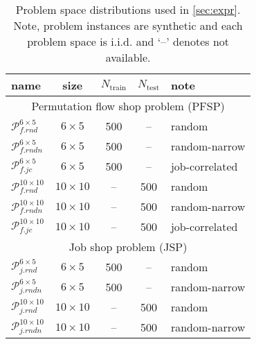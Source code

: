 \documentclass[graybox]{svmult}
\begin{document}
\begin{table}\centering
	\caption{Problem space distributions used in \cref{sec:expr}. Note, problem 
		instances are synthetic and each problem space is i.i.d. and `--' 
		denotes not 
		available.}\label{tbl:data:sim}
	{\renewcommand{\arraystretch}{1.5}
		\begin{tabular}{l|c|c|c|l}\toprule
			name                                & size         & $N_{\text{train}}$ & $N_{\text{test}}$ & note           
			\\  \midrule
			\multicolumn{5}{c}{Permutation flow shop problem (PFSP)} \\ \midrule
			$\mathcal{P}_{f.rnd}^{6\times5}$    & $6\times5$   & 500                & --                & random         \\ 
			$\mathcal{P}_{f.rndn}^{6\times5}$   & $6\times5$   & 500                & --                & random-narrow  \\ 
			$\mathcal{P}_{f.jc}^{6\times5}$     & $6\times5$   & 500                & --                & job-correlated \\ 
			$\mathcal{P}_{f.rnd}^{10\times10}$  & $10\times10$ & --                 & 500               & random         \\ 
			$\mathcal{P}_{f.rndn}^{10\times10}$ & $10\times10$ & --                 & 500               & random-narrow  \\ 
			$\mathcal{P}_{f.jc}^{10\times10}$   & $10\times10$ & --                 & 500               & job-correlated \\ 
			\midrule
			\multicolumn{5}{c}{Job shop problem (JSP)} \\ \midrule
			$\mathcal{P}_{j.rnd}^{6\times5}$    & $6\times5$   & 500                & --                & random         \\
			$\mathcal{P}_{j.rndn}^{6\times5}$   & $6\times5$   & 500                & --                & random-narrow  \\
			$\mathcal{P}_{j.rnd}^{10\times10}$  & $10\times10$ & --                 & 500               & random         \\
			$\mathcal{P}_{j.rndn}^{10\times10}$ & $10\times10$ & --                 & 500               & random-narrow  \\ 
			\bottomrule
		\end{tabular}
	}
\end{table}
\end{document}
